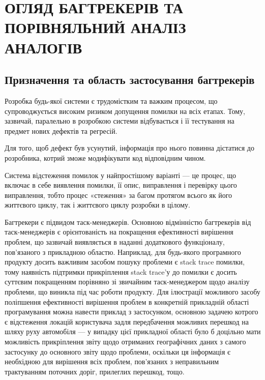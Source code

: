 \documentclass[../main.tex]{subfiles}
\begin{document}
\chapter{ОГЛЯД БАГТРЕКЕРІВ ТА ПОРІВНЯЛЬНИЙ АНАЛІЗ АНАЛОГІВ}

\section{Призначення та область застосування багтрекерів}

Розробка будь-якої системи є трудомістким та важким процесом, що супроводжується високим ризиком допущення помилки на всіх етапах. Тому, зазвичай, паралельно в розробкою системи відбувається і її тестування на предмет нових дефектів та регресій.

Для того, щоб дефект був усунутий, інформація про нього повинна дістатися до розробника, котрий зможе модифікувати код відповідним чином.

Система відстеження помилок у найпростішому варіанті — це процес, що включає в себе виявлення помилки, її опис, виправлення і перевірку цього виправлення, тобто процес «стеження» за багом протягом всього як його життєвого циклу, так і життєвого циклу розробки в цілому.\cite{bugtracking_systems}

Багтрекери є підвидом таск-менеджерів. Основною відмінністю багтрекерів від таск-менеджерів є  орієнтованість на покращення ефективності вирішення проблем, що зазвичай виявляється в наданні додаткового функціоналу, пов'язаного з прикладною областю. Наприклад, для будь-якого програмного продукту досить важливим засобом пошуку проблеми є stack trace помилки, тому наявність підтримки прикріплення stack trace'у до помилки є досить суттєвим покращенням порівняно зі звичайним таск-менеджером щодо аналізу проблеми, що виникла під час роботи продукту. Для ілюстрації можливого засобу поліпшення ефективності вирішення проблем в конкретній прикладній області програмування можна навести приклад з застосунком, основною задачею котрого є відстеження локацій користувача задля передбачення можливих перешкод на шляху руху автомобіля — у випадку цієї прикладної області було б доцільно мати можливість прикріплення звіту щодо отриманих географічних даних з самого застосунку до основного звіту щодо проблеми, оскільки ця інформація є необхідною для вирішення всіх проблем, пов'язаних з неправильним трактуванням поточних доріг, прилеглих перешкод, тощо.
\end{document}
